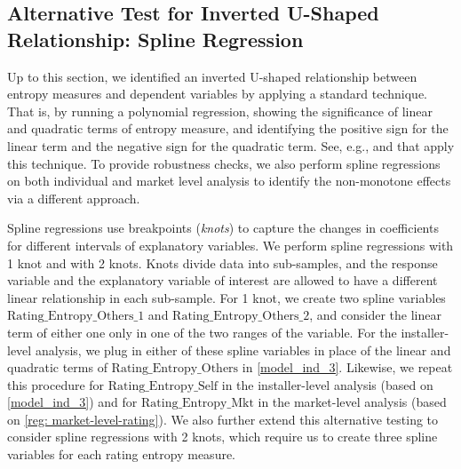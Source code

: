 \documentclass[msom,blindrev]{informs3}
\begin{document}
	
	
	
	\subsection{Alternative Test for Inverted U-Shaped Relationship: Spline Regression}
	
	
	Up to this section, we identified an inverted U-shaped relationship between entropy measures and dependent variables by applying a standard technique. That is, by running a polynomial regression, showing the significance of linear and quadratic terms of entropy measure, and identifying the positive sign for the linear term and the negative sign for the quadratic term. See, e.g., \cite{tan2014does} and \cite{kesavan2014volume} that apply this technique. To provide robustness checks, we also perform spline regressions on both individual and market level analysis to identify the non-monotone effects via a different approach.

	
	Spline regressions use breakpoints (\emph{knots}) to capture the changes in coefficients for different intervals of explanatory variables. We perform spline regressions with 1 knot and with 2 knots. Knots divide data into sub-samples, and the response variable and the explanatory variable of interest are allowed to have a different linear relationship in each sub-sample. For 1 knot, we create two spline variables $\text{Rating\_Entropy\_Others\_1}$ and  $\text{Rating\_Entropy\_Others\_2}$, and consider the linear term of either one only in one of the two ranges of the variable. For the installer-level analysis, we plug in either of these spline variables in place of the linear and quadratic terms of $\text{Rating\_Entropy\_Others}$ in \eqref{model_ind_3}.  Likewise, we repeat this procedure for $\text{Rating\_Entropy\_Self}$ in the installer-level analysis (based on \eqref{model_ind_3}) and  for $\text{Rating\_Entropy\_Mkt}$ in the market-level analysis (based on \eqref{reg: market-level-rating}). We also further extend this alternative testing to consider spline regressions with 2 knots, which require us to create three spline variables for each rating entropy measure.
	
	
\end{document}

